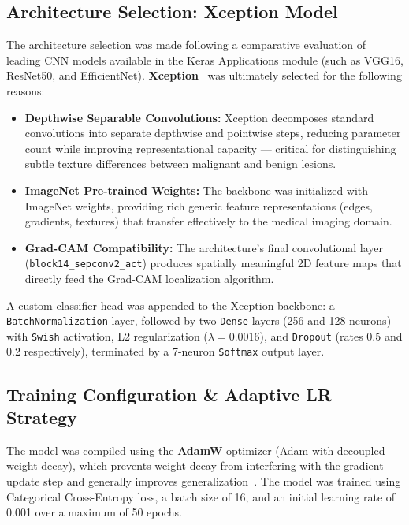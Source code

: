 \subsection{Architecture Selection: Xception Model}
The architecture selection was made following a comparative evaluation of leading CNN models available in the Keras Applications module (such as VGG16, ResNet50, and EfficientNet). \textbf{Xception}~\cite{Xception} was ultimately selected for the following reasons:
\begin{itemize}
	\item \textbf{Depthwise Separable Convolutions:} Xception decomposes standard
	convolutions into separate depthwise and pointwise steps, reducing
	parameter count while improving representational capacity --- critical for
	distinguishing subtle texture differences between malignant and benign lesions.
	\item \textbf{ImageNet Pre-trained Weights:} The backbone was initialized with
	ImageNet weights, providing rich generic feature representations (edges,
	gradients, textures) that transfer effectively to the medical imaging domain.
	\item \textbf{Grad-CAM Compatibility:} The architecture's final convolutional
	layer (\texttt{block14\_sepconv2\_act}) produces spatially meaningful 2D
	feature maps that directly feed the Grad-CAM localization algorithm.
\end{itemize}

A custom classifier head was appended to the Xception backbone: a
\texttt{BatchNormalization} layer, followed by two \texttt{Dense} layers (256 and
128 neurons) with \texttt{Swish} activation, L2 regularization
($\lambda = 0.0016$), and \texttt{Dropout} (rates 0.5 and 0.2 respectively),
terminated by a 7-neuron \texttt{Softmax} output layer.

\subsection{Training Configuration \& Adaptive LR Strategy}
The model was compiled using the \textbf{AdamW} optimizer (Adam with decoupled
weight decay), which prevents weight decay from interfering with the gradient
update step and generally improves generalization~\cite{TensorFlow}. The model was trained using Categorical Cross-Entropy loss, a batch size of 16, and an initial learning rate of 0.001 over a maximum of 50 epochs.

